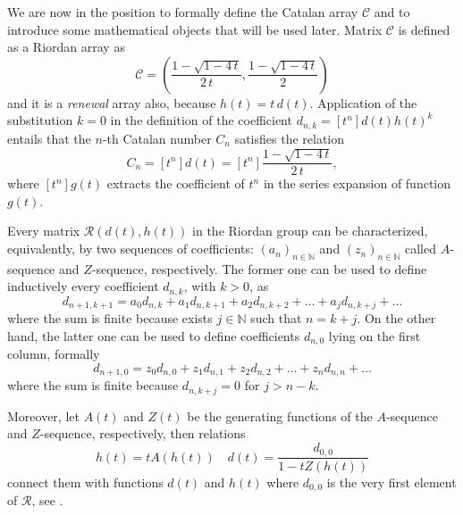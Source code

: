 We are now in the position to formally define the Catalan
array $\mathcal{C}$ and to introduce some mathematical objects
that will be used later. Matrix $\mathcal{C}$ is defined 
as a Riordan array as
\begin{displaymath}
    \mathcal{C}=\left(\frac{1-\sqrt{1-4\,t}}{2\,t},
        \frac{1-\sqrt{1-4\,t}}{2}\right)
\end{displaymath}
and it is a \emph{renewal} array \cite{rogers:1977} also, because
$h(t)=t\,d(t)$. Application of the substitution $k=0$ in the definition of the
coefficient $\displaystyle d_{n,k} = [t^{n}]d(t)h(t)^{k}$ entails that the
$n$-th Catalan number $C_{n}$ satisfies the relation
\begin{displaymath}
    C_{n} = [t^{n}]d(t)= [t^{n}]\frac{1-\sqrt{1-4\,t}}{2\,t},
\end{displaymath}
where $[t^{n}]g(t)$ extracts the coefficient of $t^{n}$ in the series expansion
of function $g(t)$.

Every matrix $\mathcal{R}(d(t), h(t))$ in the Riordan group can be characterized, equivalently,
by two sequences of coefficients: $\left(a_{n}\right)_{n\in\mathbb{N}}$  and
$\left(z_{n}\right)_{n\in\mathbb{N}}$ called $A$-sequence and $Z$-sequence, 
respectively. The former one can be used to define inductively every coefficient $d_{n,k}$, with $k>0$, as 
\begin{equation}
    d_{n+1, k+1} = a_{0}d_{n,k} + a_{1}d_{n,k+1} + a_{2}d_{n,k+2} + \ldots + a_{j}d_{n,k+j} + \ldots %
\end{equation}
where the sum is finite because exists $j\in\mathbb{N}$ such that $n=k+j$. On the other hand, the latter one
can be used to define coefficients $d_{n,0}$ lying on the first column, formally
\begin{equation}
    d_{n+1, 0} = z_{0}d_{n,0} + z_{1}d_{n,1} + z_{2}d_{n,2} + \ldots + z_{n}d_{n,n} + \ldots %
\end{equation}
where the sum is finite because $d_{n,k+j}=0$ for $j>n-k$.

Moreover, let $A(t)$ and $Z(t)$ be the generating functions of the $A$-sequence and $Z$-sequence, respectively,
then relations 
\begin{equation}
    h(t) = tA(h(t)) \quad d(t)=\frac{d_{0,0}}{1-tZ(h(t))}
\end{equation}
connect them with functions $d(t)$ and $h(t)$ 
where $d_{0,0}$ is the very first element %
of $\mathcal{R}$, see \cite{merlini:some:alternative:characterizations:1997}.

